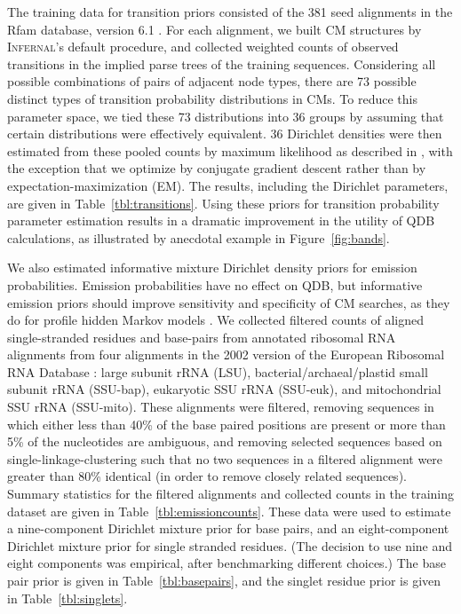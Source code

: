 \documentclass[11pt]{article}
\newif\ifdraft
\begin{document}
\ifdraft

\fi

The training data for transition priors consisted of the 381 seed
alignments in the Rfam database, version 6.1
\cite{Griffiths-Jones05}. For each alignment, we built CM structures
by \textsc{Infernal}'s default procedure, and collected weighted
counts of observed transitions in the implied parse trees of the
training sequences. Considering all possible combinations of pairs of
adjacent node types, there are 73 possible distinct types of
transition probability distributions in CMs. To reduce this parameter
space, we tied these 73 distributions into 36 groups by assuming that
certain distributions were effectively equivalent.  36 Dirichlet
densities were then estimated from these pooled counts by maximum
likelihood as described in \cite{Sjolander96}, with the exception that
we optimize by conjugate gradient descent \cite{Press93} rather than
by expectation-maximization (EM).  The results, including the
Dirichlet parameters, are given in Table~\ref{tbl:transitions}.  Using
these priors for transition probability parameter estimation results
in a dramatic improvement in the utility of QDB calculations, as
illustrated by anecdotal example in Figure~\ref{fig:bands}.

\ifdraft

\fi

We also estimated informative mixture Dirichlet density priors for
emission probabilities.  Emission probabilities have no effect on QDB,
but informative emission priors should improve sensitivity and
specificity of CM searches, as they do for profile hidden Markov
models \cite{Brown93b,Sjolander96}. We collected filtered counts of
aligned single-stranded residues and base-pairs from annotated
ribosomal RNA alignments from four alignments in the 2002 version of
the European Ribosomal RNA Database \cite{VandePeer00, Wuyts01}: large
subunit rRNA (LSU), bacterial/archaeal/plastid small subunit rRNA
(SSU-bap), eukaryotic SSU rRNA (SSU-euk), and mitochondrial SSU rRNA
(SSU-mito). These alignments were filtered, removing sequences in
which either less than 40\% of the base paired positions are present
or more than 5\% of the nucleotides are ambiguous, and removing
selected sequences based on single-linkage-clustering such that no two
sequences in a filtered alignment were greater than 80\% identical (in
order to remove closely related sequences). Summary statistics for the
filtered alignments and collected counts in the training dataset are
given in Table~\ref{tbl:emissioncounts}. These data were used to
estimate a nine-component Dirichlet mixture prior for base pairs, and
an eight-component Dirichlet mixture prior for single stranded
residues. (The decision to use nine and eight components was
empirical, after benchmarking different choices.) The base pair prior
is given in Table~\ref{tbl:basepairs}, and the singlet residue prior
is given in Table~\ref{tbl:singlets}.
\end{document}

